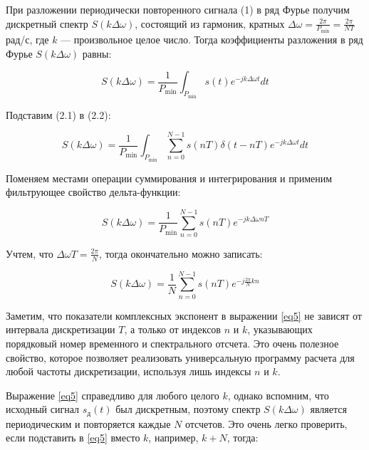 При разложении периодически повторенного сигнала (1) в ряд Фурье получим дискретный спектр \( S(k \Delta \omega) \), состоящий из гармоник, кратных \( \Delta\omega = \frac{2\pi}{P_{\text{min}}} = \frac{2\pi}{NT} \) рад/с, где \( k \) — произвольное целое число. Тогда коэффициенты разложения в ряд Фурье \( S(k \Delta \omega) \) равны:

\begin{equation}
\label{eq2}
S(k \Delta \omega) = \frac{1}{P_{\text{min}}} \int_{P_{\text{min}}} s(t) e^{-jk\Delta\omega t} dt \tag{2.2}
\end{equation}

Подставим (2.1) в (2.2):

\begin{equation}
\label{eq3}
S(k \Delta \omega) = \frac{1}{P_{\text{min}}} \int_{P_{\text{min}}} \sum_{n=0}^{N-1} s(nT) \delta(t - nT) e^{-jk\Delta\omega t} dt \tag{2.3}
\end{equation}

Поменяем местами операции суммирования и интегрирования и применим фильтрующее свойство дельта-функции:

\begin{equation}
\label{eq4}
S(k \Delta \omega) = \frac{1}{P_{\text{min}}} \sum_{n=0}^{N-1} s(nT) e^{-jk\Delta\omega nT} \tag {2.4}
\end{equation}

Учтем, что \( \Delta \omega T = \frac{2\pi}{N} \), тогда окончательно можно записать:

\begin{equation}
\label{eq5}
S(k \Delta \omega) = \frac{1}{N} \sum_{n=0}^{N-1} s(nT) e^{-j\frac{2\pi}{N}kn} \tag{2.5}
\end{equation}

Заметим, что показатели комплексных экспонент в выражении \eqref{eq5} не зависят от интервала дискретизации \( T \), а только от индексов \( n \) и \( k \), указывающих порядковый номер временного и спектрального отсчета. Это очень полезное свойство, которое позволяет реализовать универсальную программу расчета для любой частоты дискретизации, используя лишь индексы \( n \) и \( k \).

Выражение \eqref{eq5} справедливо для любого целого \( k \), однако вспомним, что исходный сигнал \( s_{\text{д}}(t) \) был дискретным, поэтому спектр \( S(k \Delta \omega) \) является периодическим и повторяется каждые \( N \) отсчетов. Это очень легко проверить, если подставить в \eqref{eq5} вместо \( k \), например, \( k+N \), тогда:

